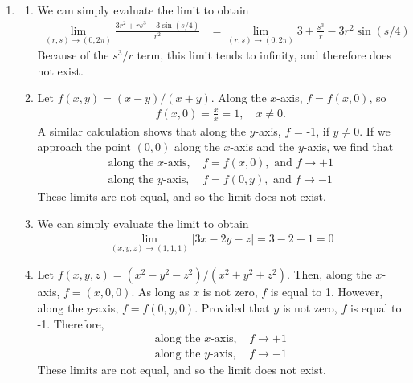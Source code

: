 \documentclass{article}
\begin{document}
\begin{enumerate}
\item
\begin{enumerate}
\item We can simply evaluate the limit to obtain
\begin{align*}
\lim_{(r,s)\rightarrow(0,2\pi) } \frac{3r^2+rs^3-3\sin (s/4)}{r^2}
&= \lim_{(r,s)\rightarrow(0,2\pi) }3+\frac{s^3}{r}-3r^2\sin (s/4)
\end{align*}
Because of the $s^3/r$ term, this limit tends to infinity, and therefore does not exist.
\item Let $f(x,y) = (x-y)/(x+y)$. Along the $x$-axis, $f=f(x,0)$, so 
\begin{align*}
f(x,0) = \frac{x}{x} = 1, \quad x\ne 0.
\end{align*}
A similar calculation shows that along the $y$-axis, $f$ = -1, if $y\ne0$. If we approach the point $(0,0)$ along the $x$-axis and the $y$-axis, we find that 
\begin{align*}
\text{along the $x$-axis, } & f = f(x,0),\text{ and } f \rightarrow +1 \\
\text{along the $y$-axis, } & f = f(0,y),\text{ and } f \rightarrow -1 
\end{align*}
These limits are not equal, and so the limit does not exist. 
\item We can simply evaluate the limit to obtain 
\begin{align*}
  \lim_{(x,y,z)\rightarrow(1,1,1)} \big|3x - 2y - z \big| = 3 -2 -1 = 0
\end{align*}
\item  Let $f(x,y,z) = (x^2-y^2-z^2)/(x^2+y^2+z^2)$. Then, along the $x$-axis, $f=(x,0,0)$. As long as $x$ is not zero, $f$ is equal to 1. However, along the $y$-axis, $f=f(0,y,0)$. Provided that $y$ is not zero, $f$ is equal to -1. Therefore,
\begin{align*}
\text{along the $x$-axis, } & f \rightarrow +1 \\
\text{along the $y$-axis, } & f \rightarrow -1 
\end{align*}
These limits are not equal, and so the limit does not exist. 

\end{enumerate}
\end{enumerate}
\end{document}
